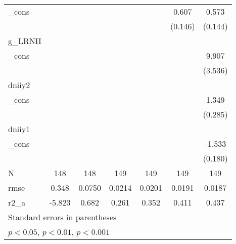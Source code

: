 \begin{table}[htbp]
\begin{tabular}{l*{6}{c}}
\_cons    &                  &                  &                  &                  &    0.607\sym{***}&    0.573\sym{***}\\
          &                  &                  &                  &                  &  (0.146)         &  (0.144)         \\
[1em]
g\_LRNII   &                  &                  &                  &                  &                  &                  \\
\_cons    &                  &                  &                  &                  &                  &    9.907\sym{**} \\
          &                  &                  &                  &                  &                  &  (3.536)         \\
[1em]
dniiy2    &                  &                  &                  &                  &                  &                  \\
\_cons    &                  &                  &                  &                  &                  &    1.349\sym{***}\\
          &                  &                  &                  &                  &                  &  (0.285)         \\
[1em]
dniiy1    &                  &                  &                  &                  &                  &                  \\
\_cons    &                  &                  &                  &                  &                  &   -1.533\sym{***}\\
          &                  &                  &                  &                  &                  &  (0.180)         \\
\hline
N         &      148         &      148         &      149         &      149         &      149         &      149         \\
rmse      &    0.348         &   0.0750         &   0.0214         &   0.0201         &   0.0191         &   0.0187         \\
r2\_a      &   -5.823         &    0.682         &    0.261         &    0.352         &    0.411         &    0.437         \\
\hline\hline
\multicolumn{7}{l}{\footnotesize Standard errors in parentheses}\\
\multicolumn{7}{l}{\footnotesize \sym{*} \(p<0.05\), \sym{**} \(p<0.01\), \sym{***} \(p<0.001\)}\\
\end{tabular}
\end{table}
